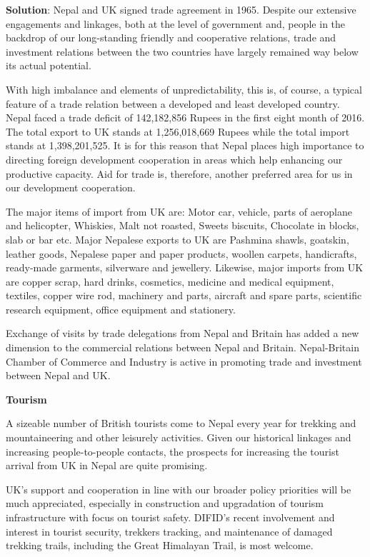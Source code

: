 \documentclass[
]{book}
\newenvironment{solution}{ {\bfseries Solution}:}{}
\begin{document}
\begin{solution}
Nepal and UK signed trade agreement in 1965. Despite our extensive engagements and linkages, both at the level of government and, people in the backdrop of our long-standing friendly and cooperative relations, trade and investment relations between the two countries have largely remained way below its actual potential.

With high imbalance and elements of unpredictability, this is, of course, a typical feature of a trade relation between a developed and least developed country. Nepal faced a trade deficit of 142,182,856 Rupees in the first eight month of 2016. The total export to UK stands at 1,256,018,669 Rupees while the total import stands at 1,398,201,525. It is for this reason that Nepal places high importance to directing foreign development cooperation in areas which help enhancing our productive capacity. Aid for trade is, therefore, another preferred area for us in our development cooperation. 

The major items of import from UK are: Motor car, vehicle, parts of aeroplane and helicopter, Whiskies, Malt not roasted, Sweets biscuits, Chocolate in blocks, slab or bar etc. Major Nepalese exports to UK are Pashmina shawls, goatskin, leather goods, Nepalese paper and paper products, woollen carpets, handicrafts, ready-made garments, silverware and jewellery. Likewise, major imports from UK are copper scrap, hard drinks, cosmetics, medicine and medical equipment, textiles, copper wire rod, machinery and parts, aircraft and spare parts, scientific research equipment, office equipment and stationery.

Exchange of visits by trade delegations from Nepal and Britain has added a new dimension to the commercial relations between Nepal and Britain. Nepal-Britain Chamber of Commerce and Industry is active in promoting trade and investment between Nepal and UK.

\textbf{Tourism}

A sizeable number of British tourists come to Nepal every year for trekking and mountaineering and other leisurely activities. Given our historical linkages and increasing people-to-people contacts, the prospects for increasing the tourist arrival from UK in Nepal are quite promising.

UK's support and cooperation in line with our broader policy priorities will be much appreciated, especially in construction and upgradation of tourism infrastructure with focus on tourist safety. DIFID’s recent involvement and interest in tourist security, trekkers tracking, and maintenance of damaged trekking trails, including the Great Himalayan Trail, is most welcome.


\end{solution}
\end{document}

